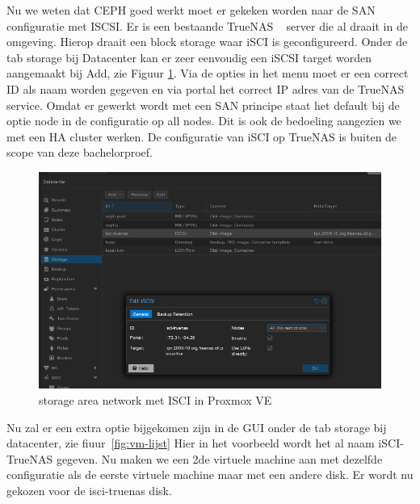 Nu we weten dat CEPH goed werkt moet er gekeken worden naar de SAN configuratie met ISCSI.
Er is een bestaande TrueNAS ~\autocite{truenas} server die al draait in de omgeving. Hierop draait een block storage waar iSCI is geconfigureerd.
Onder de tab storage bij Datacenter kan er zeer eenvoudig een iSCSI target worden aangemaakt bij Add, zie Figuur \ref{fig:iscsi-SAN}.
Via de opties in het menu moet er een correct ID als naam worden gegeven en via portal het correct IP adres van de TrueNAS service.
Omdat er gewerkt wordt met een SAN principe staat het default bij de optie node in de configuratie op all nodes. Dit is ook de bedoeling aangezien we met een HA cluster werken.
De configuratie van iSCI op TrueNAS is buiten de scope van deze bachelorproef.
\begin{figure}[H]
  \centering
  \includegraphics[width=1.0\textwidth]{../poc/iscsi-prox.png}
  \caption{storage area network met ISCI in Proxmox VE}
  \label{fig:iscsi-SAN}
\end{figure}
Nu zal er een extra  optie bijgekomen zijn in de GUI onder de tab storage bij datacenter, zie fiuur~\ref{fig:vm-lijst}  Hier in het voorbeeld wordt het al naam iSCI-TrueNAS gegeven.
Nu maken we een 2de virtuele machine aan met dezelfde configuratie als de eerste virtuele machine maar met een andere disk. Er wordt nu gekozen voor de isci-truenas disk.
